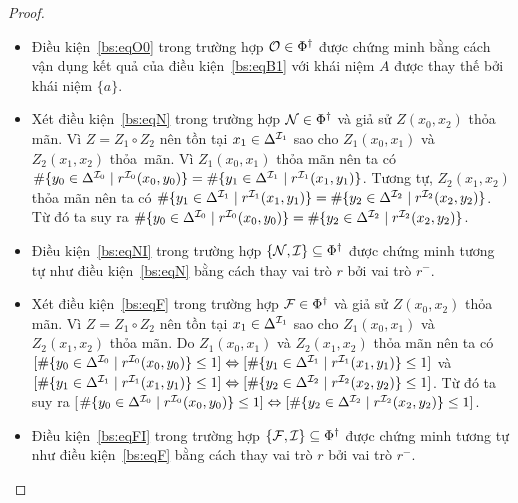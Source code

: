 \begin{proof}
\begin{itemize}
		\item Điều kiện~\eqref{bs:eqO0} trong trường hợp $\mathcal{O} \in \Phi^\dag$ được chứng minh bằng cách vận dụng kết quả của điều kiện~\eqref{bs:eqB1} với khái niệm $A$ được thay thế bởi khái niệm $\{a\}$.
		
		\item Xét điều kiện~\eqref{bs:eqN} trong trường hợp $\mathcal{N} \in \Phi^\dag$ và giả sử $Z(x_0, x_2)$ thỏa mãn. Vì $Z=Z_1 \circ Z_2$ nên tồn tại $x_1 \in \Delta^{\mathcal{I}_1}$ sao cho  $Z_1(x_0,x_1)$ và $Z_2(x_1, x_2)$ thỏa~mãn. Vì $Z_1(x_0,x_1)$ thỏa mãn nên ta có $\#\{y_0 \in \Delta^{\mathcal{I}_0} \mid r^{\mathcal{I}_0}(x_0,y_0)\} = \#\{y_1 \in \Delta^{\mathcal{I}_1} \mid r^{\mathcal{I}_1}(x_1,y_1)\}$. Tương tự, $Z_2(x_1, x_2)$ thỏa mãn nên ta có $\#\{y_1 \in \Delta^{\mathcal{I}_1} \mid r^{\mathcal{I}_1}(x_1,y_1)\} = \#\{y_2 \in \Delta^{\mathcal{I}_2} \mid r^{\mathcal{I}_2}(x_2,y_2)\}$. Từ đó ta suy ra $\#\{y_0 \in \Delta^{\mathcal{I}_0} \mid r^{\mathcal{I}_0}(x_0,y_0)\} = \#\{y_2 \in \Delta^{\mathcal{I}_2} \mid r^{\mathcal{I}_2}(x_2,y_2)\}$.
		
		\item Điều kiện~\eqref{bs:eqNI} trong trường hợp $\{\mathcal{N}, \mathcal{I}\} \subseteq \Phi^\dag$ được chứng minh tương tự như điều kiện~\eqref{bs:eqN} bằng cách thay vai trò $r$ bởi vai trò $r^-$.
		
		\item Xét điều kiện~\eqref{bs:eqF} trong trường hợp $\mathcal{F} \in \Phi^\dag$ và giả sử $Z(x_0, x_2)$ thỏa mãn. Vì $Z = Z_1 \circ Z_2$ nên tồn tại $x_1 \in \Delta^{\mathcal{I}_1}$ sao cho  $Z_1(x_0,x_1)$ và $Z_2(x_1, x_2)$ thỏa mãn. Do $Z_1(x_0,x_1)$ và $Z_2(x_1, x_2)$ thỏa mãn nên ta có $[\#\{y_0 \in \Delta^{\mathcal{I}_0} \mid r^{\mathcal{I}_0}(x_0,y_0)\} \leq 1] \Leftrightarrow [\#\{y_1 \in \Delta^{\mathcal{I}_1} \mid r^{\mathcal{I}_1}(x_1,y_1)\} \leq 1]$ và $[\#\{y_1 \in \Delta^{\mathcal{I}_1} \mid r^{\mathcal{I}_1}(x_1,y_1)\} \leq 1] \Leftrightarrow [\#\{y_2 \in \Delta^{\mathcal{I}_2} \mid r^{\mathcal{I}_2}(x_2,y_2)\} \leq 1]$. Từ đó ta suy ra [$\#\{y_0 \in \Delta^{\mathcal{I}_0} \mid r^{\mathcal{I}_0}(x_0,y_0)\} \leq 1] \Leftrightarrow [\#\{y_2 \in \Delta^{\mathcal{I}_2} \mid r^{\mathcal{I}_2}(x_2,y_2)\} \leq 1]$.
		
		\item Điều kiện~\eqref{bs:eqFI} trong trường hợp $\{\mathcal{F}, \mathcal{I}\} \subseteq \Phi^\dag$ được chứng minh tương tự như điều kiện~\eqref{bs:eqF} bằng cách thay vai trò $r$ bởi vai trò $r^-$.
		

\end{itemize}
\end{proof}
